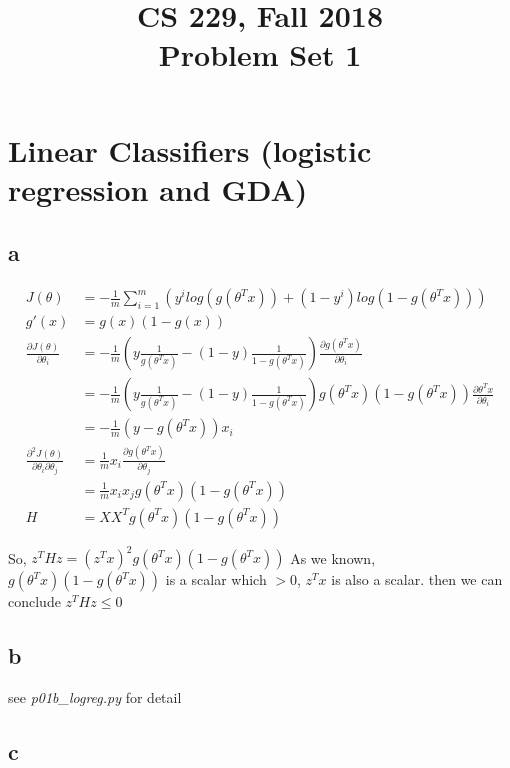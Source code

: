 \documentclass[UTF8]{article}
\title{CS 229, Fall 2018\protect\\Problem Set 1}
\begin{document}
\maketitle
\section{Linear Classifiers (logistic regression and GDA)}
\subsection{a}

\begin{equation*}
    \begin{split}
        J(\theta) & = -\frac{1}{m}\sum_{i=1}^{m}(y^ilog(g(\theta^Tx))+(1-y^i)log(1-g(\theta^Tx)))\\
        g'(x) & = g(x)(1-g(x))\\
        \frac{\partial J(\theta)}{\partial \theta_i} & = -\frac{1}{m}(y\frac{1}{g(\theta^Tx)}-(1-y)\frac{1}{1-g(\theta^Tx)})\frac{\partial g(\theta^Tx)}{\partial \theta_i}\\
        & = -\frac{1}{m}(y\frac{1}{g(\theta^Tx)}-(1-y)\frac{1}{1-g(\theta^Tx)})g(\theta^Tx)(1-g(\theta^Tx))\frac{\partial \theta^Tx}{\partial \theta_i}\\
        & = -\frac{1}{m}(y-g(\theta^Tx))x_i\\
        \frac{\partial^2 J(\theta)}{\partial \theta_i\partial \theta_j}
        & = \frac{1}{m}x_i\frac{\partial g(\theta^Tx)}{\partial \theta_j}\\
        & = \frac{1}{m}x_ix_jg(\theta^Tx)(1-g(\theta^Tx))\\
        H &= XX^Tg(\theta^Tx)(1-g(\theta^Tx))
    \end{split}
\end{equation*}

So, $z^THz = (z^Tx)^2g(\theta^Tx)(1-g(\theta^Tx))$ As we known, $g(\theta^Tx)(1-g(\theta^Tx))$ is a scalar which $>0$, $z^Tx$ is also a scalar.
then we can conclude $z^THz \leq 0$

\subsection{b}

see \textit{p01b\_logreg.py} for detail

\subsection{c}
\end{document}
